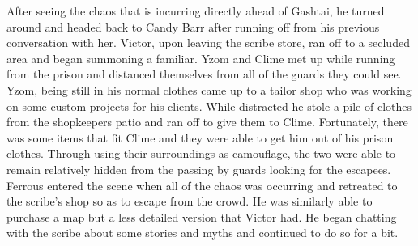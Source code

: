 After seeing the chaos that is incurring directly ahead of Gashtai, he turned around and headed back to Candy Barr after running off from his previous conversation with her. Victor, upon leaving the scribe store, ran off to a secluded area and began summoning a familiar. Yzom and Clime met up while running from the prison and distanced themselves from all of the guards they could see. Yzom, being still in his normal clothes came up to a tailor shop who was working on some custom projects for his clients. While distracted he stole a pile of clothes from the shopkeepers patio and ran off to give them to Clime. Fortunately, there was some items that fit Clime and they were able to get him out of his prison clothes. Through using their surroundings as camouflage, the two were able to remain relatively hidden from the passing by guards looking for the escapees. Ferrous entered the scene when all of the chaos was occurring and retreated to the scribe's shop so as to escape from the crowd. He was similarly able to purchase a map but a less detailed version that Victor had. He began chatting with the scribe about some stories and myths and continued to do so for a bit.







